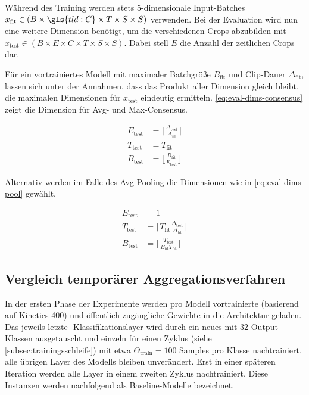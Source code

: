 Während des Training werden stets 5-dimensionale Input-Batches $x_\text{fit} \in (B \times \gls{tld:C} \times T \times S \times S)$ verwenden.
Bei der Evaluation wird nun eine weitere Dimension benötigt, um die verschiedenen Crops abzubilden mit $x_\text{test} \in (B \times E \times C \times T \times S \times S)$.
Dabei stell $E$ die Anzahl der zeitlichen Crops dar.

Für ein vortrainiertes Modell mit maximaler Batchgröße $B_\text{fit}$ und Clip-Dauer $\Delta_\text{fit}$, lassen sich unter der Annahmen, dass das Produkt aller Dimension gleich bleibt, die maximalen Dimensionen für $x_\text{test}$ eindeutig ermitteln.
\autoref{eq:eval-dims-consensus} zeigt die Dimension für Avg- und Max-Consensus.

\begin{equation}
    \label{eq:eval-dims-consensus}
    \begin{split}
    E_\text{test}           & = \lceil  \frac{\Delta_\text{test}}{\Delta_\text{fit}}  \rceil \\
    T_\text{test}           & = T_{\text{fit}} \\
    B_\text{test}           & = \lfloor \frac{B_\text{fit}}{E_\text{test}} \rfloor
    \end{split}
\end{equation}

Alternativ werden im Falle des Avg-Pooling die Dimensionen wie in \autoref{eq:eval-dims-pool} gewählt.

\begin{equation}
    \label{eq:eval-dims-pool}
    \begin{split}
    E_\text{test}           & = 1 \\
    T_\text{test}           & = \lceil T_\text{fit} \frac{\Delta_\text{test}}{\Delta_\text{fit}} \rceil \\
    B_\text{test}           & = \lfloor \frac{T_\text{test} }{B_\text{fit} T_\text{fit}} \rfloor
    \end{split}
\end{equation}

\subsection{Vergleich temporärer Aggregationsverfahren}
\label{subsec:initialisierungsphase}

In der ersten Phase der Experimente werden pro Modell vortrainierte (basierend auf Kinetics-400) und öffentlich zugängliche Gewichte in die Architektur geladen.
Das jeweils letzte \fc-Klassifikationslayer wird durch ein neues mit 32 Output-Klassen ausgetauscht und einzeln für einen Zyklus (siehe \autoref{subsec:trainingsschleife}) mit etwa $\Theta_\text{train} = 100$ Samples pro Klasse nachtrainiert.
\Dh alle übrigen Layer des Modells bleiben unverändert.
Erst in einer späteren Iteration werden alle Layer in einem zweiten Zyklus nachtrainiert.
Diese Instanzen werden nachfolgend als Baseline-Modelle bezeichnet.

